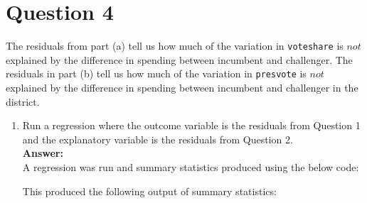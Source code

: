 \documentclass[12pt,letterpaper]{article}
\begin{document}
\section*{Question 4}
\noindent The residuals from part (a) tell us how much of the variation in \texttt{voteshare} is $not$ explained by the difference in spending between incumbent and challenger. The residuals in part (b) tell us how much of the variation in \texttt{presvote} is $not$ explained by the difference in spending between incumbent and challenger in the district.
	\begin{enumerate}
		\item Run a regression where the outcome variable is the residuals from Question 1 and the explanatory variable is the residuals from Question 2.\\
		
		\textbf{Answer:}\\
		
		A regression was run and summary statistics produced using the below code:
		
		\vspace{.5cm}
		
		  
		
		\vspace{.5cm}
		
		This produced the following output of summary statistics:
		
		\vspace{.5cm}
		

\end{enumerate}
\end{document}
